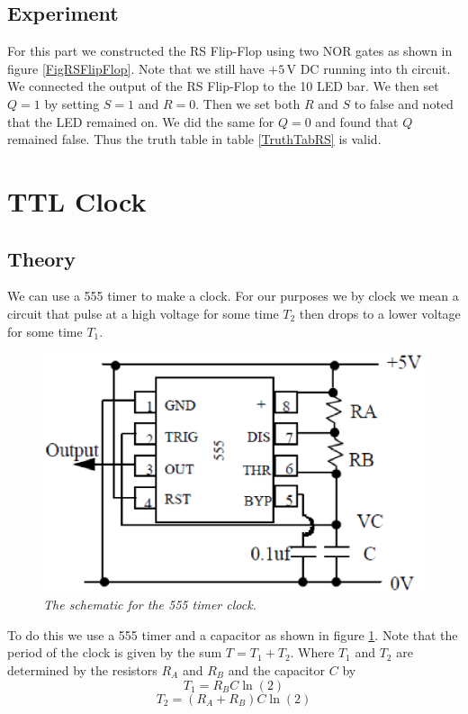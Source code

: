 \documentclass[11pt]{article}
\numberwithin{equation}{section}
\numberwithin{figure}{section}
\numberwithin{table}{section}
\newcommand{\unit}[1]{\ensuremath{\, \mathrm{#1}}}
\begin{document}
\subsection{Experiment}
For this part we constructed the RS Flip-Flop using two NOR gates as shown in figure \ref{FigRSFlipFlop}. Note that we still have $+5\unit{V}$ DC running into th circuit. We connected the output of the RS Flip-Flop to the 10 LED bar. We then set $Q=1$ by setting $S=1$ and $R=0$. Then we set both $R$ and $S$ to false and noted that the LED remained on. We did the same for $Q=0$ and found that $Q$ remained false. Thus the truth table in table \ref{TruthTabRS} is valid.

\section{TTL Clock}
\subsection{Theory}
We can use a 555 timer to make a clock. For our purposes we by clock we mean a circuit that pulse at a high voltage for some time $T_2$ then drops to a lower voltage for some time $T_1$. 
\begin{figure}[h]
\centering
\includegraphics[scale=0.50]{Fig555Timer.eps}
\caption{\textit{The schematic for the 555 timer clock.}}
\label{Fig555Timer}
\end{figure}
To do this we use a 555 timer and a capacitor as shown in figure \ref{Fig555Timer}. Note that the period of the clock is given by the sum $T = T_1+T_2$. Where $T_1$ and $T_2$ are determined by the resistors $R_A$ and $R_B$ and the capacitor $C$ by 
\begin{equation}
T_1 = R_BC\ln(2)
\label{Time1}
\end{equation}
\begin{equation}
T_2 = (R_A+R_B)C\ln(2)
\label{Time2}
\end{equation}
\end{document}
